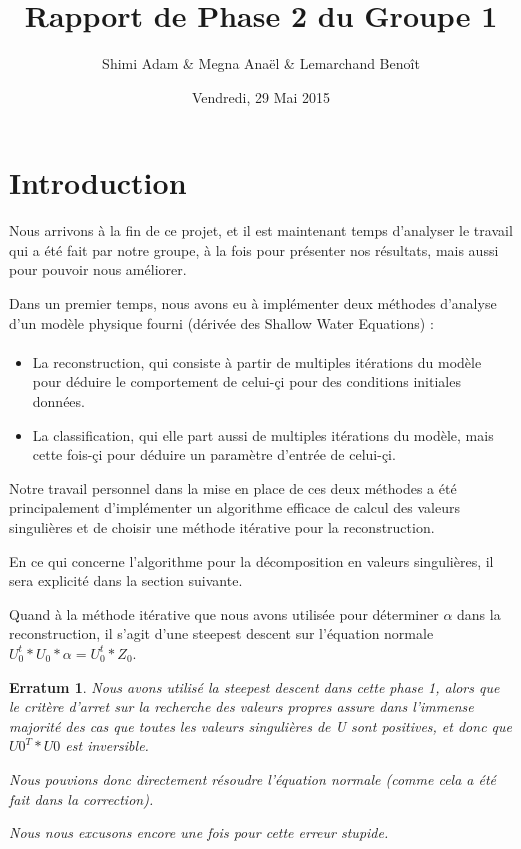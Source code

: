 \documentclass[a4paper,12pt]{article}
\title{\Huge\textbf{Rapport de Phase 2 du Groupe 1}}
\author{Shimi Adam \& Megna Anaël \& Lemarchand Benoît}
\date{Vendredi, 29 Mai 2015}
\newtheorem*{erratum}{Erratum}
\begin{document}
\begin{titlepage}
  \maketitle
  \thispagestyle{empty}
  \tableofcontents
\end{titlepage}

\section{Introduction}

    Nous arrivons à la fin de ce projet, et il est maintenant temps
    d'analyser le travail qui a été fait par notre groupe, à la fois
    pour présenter nos résultats, mais aussi pour pouvoir nous améliorer.

    Dans un premier temps, nous avons eu à implémenter deux méthodes
    d'analyse d'un modèle physique fourni (dérivée des Shallow Water Equations) :

    \paragraph{}
    \begin{itemize}
        \item La reconstruction, qui consiste à partir de multiples itérations
        du modèle pour déduire le comportement de celui-çi pour des conditions
        initiales données.
        \item La classification, qui elle part aussi de multiples itérations
        du modèle, mais cette fois-çi pour déduire un paramètre d'entrée de
        celui-çi.
    \end{itemize}

\bigskip

    Notre travail personnel dans la mise en place de ces deux méthodes
    a été principalement d'implémenter un algorithme efficace de calcul
    des valeurs singulières et de choisir une méthode itérative pour la
    reconstruction.

    En ce qui concerne l'algorithme pour la décomposition en valeurs
    singulières, il sera explicité dans la section suivante.

    Quand à la méthode itérative que nous avons utilisée pour
    déterminer $\alpha$ dans la reconstruction, il s'agit d'une
    steepest descent sur l'équation normale $U_{0}^t*U_{0}*\alpha = U_{0}^t*Z_0$.

    \begin{erratum}Nous avons utilisé la steepest descent dans
    cette phase 1, alors que le critère d'arret sur la recherche
    des valeurs propres assure dans l'immense majorité des cas
    que toutes les valeurs singulières de U sont positives, et
    donc que $U0^T*U0$ est inversible.

    Nous pouvions donc directement résoudre l'équation normale
    (comme cela a été fait dans la correction).

    Nous nous excusons encore une fois pour cette erreur stupide.
    \end{erratum}
\end{document}
